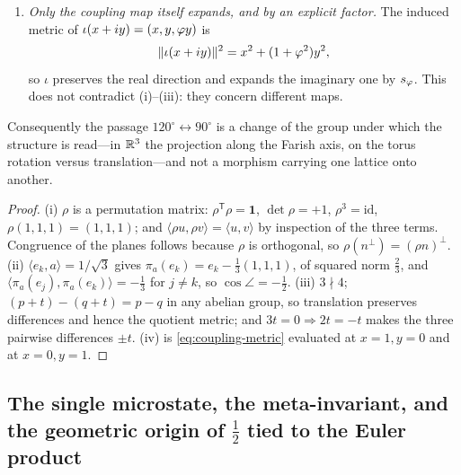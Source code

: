 \begin{proposition}
\begin{enumerate}
  the Gauss face $\tau=i$) and $\Z_3$ (translation, the ternary face) therefore act by isometries.
\item[(iv)] \emph{Only the coupling map itself expands, and by an explicit factor.} The induced metric of
  $\iota(x+iy)=(x,y,\varphi y)$ is
  \begin{equation}\label{eq:coupling-metric}
    \lVert\iota(x+iy)\rVert^{2}=x^{2}+(1+\varphi^{2})y^{2},
  \end{equation}
  so $\iota$ preserves the real direction and expands the imaginary one by $s_\varphi$. This does
  not contradict (i)--(iii): they concern different maps.
\end{enumerate}
Consequently the passage $120^{\circ}\leftrightarrow90^{\circ}$ is a change of the group under
which the structure is read---in $\mathbb{R}^{3}$ the projection along the Farish axis, on the torus
rotation versus translation---and not a morphism carrying one lattice onto another.

\end{proposition}
\begin{proof}
(i) $\rho$ is a permutation matrix: $\rho^{\mathsf T}\rho=\mathbf 1$, $\det\rho=+1$,
$\rho^{3}=\mathrm{id}$, $\rho(1,1,1)=(1,1,1)$; and $\langle\rho u,\rho v\rangle=\langle u,v\rangle$
by inspection of the three terms. Congruence of the planes follows because $\rho$ is orthogonal, so
$\rho(n^{\perp})=(\rho n)^{\perp}$.
(ii) $\langle e_k,a\rangle=1/\sqrt3$ gives $\pi_a(e_k)=e_k-\tfrac13(1,1,1)$, of squared norm
$\tfrac23$, and $\langle\pi_a(e_j),\pi_a(e_k)\rangle=-\tfrac13$ for $j\neq k$, so
$\cos\angle=-\tfrac12$.
(iii) $3\nmid4$; $(p+t)-(q+t)=p-q$ in any abelian group, so translation preserves differences and
hence the quotient metric; and $3t=0\Rightarrow2t=-t$ makes the three pairwise differences $\pm t$.
(iv) is \eqref{eq:coupling-metric} evaluated at $x=1,y=0$ and at $x=0,y=1$.
\end{proof}
\subsection{The single microstate, the meta-invariant, and the geometric
origin of $\tfrac12$ tied to the Euler product}\label{ssec:microstate}

